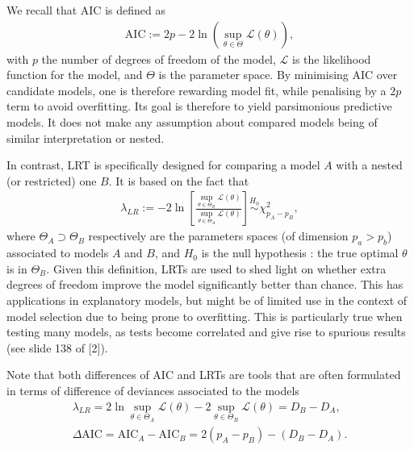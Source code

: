 \documentclass[a4paper, 12pt,oneside]{article}
\begin{document}
				We recall that AIC is defined as 
				\begin{gather}
					\text{AIC}:=2p-2\ln\left(\sup_{\theta\in\Theta}\mathcal{L(\theta)}\right),
				\end{gather}
				with $p$ the number of degrees of freedom of the model, $\mathcal L$ is the likelihood function for the model, and $\Theta$ is the parameter space. By minimising AIC over candidate models, one is therefore rewarding model fit, while penalising by a $2p$ term to avoid overfitting. Its goal is therefore to yield parsimonious predictive models. It does not make any assumption about compared models being of similar interpretation or nested. 

				In contrast, LRT is specifically designed for comparing a model $A$ with a nested (or restricted) one $B$. It is based on the fact that 
				\begin{gather}
					\lambda_{LR}:=-2\ln\left[\frac{\sup_{\theta\in\Theta_B}\mathcal{L(\theta)}}{\sup_{\theta\in\Theta_A}\mathcal{L(\theta)}}\right]
					\overset{H_0}{\sim} \chi^2_{p_A-p_B},
				\end{gather}
				where $\Theta_A\supset\Theta_B$ respectively are the parameters spaces (of dimension $p_a>p_b$) associated to models $A$ and $B$, and $H_0$ is the null hypothesis : the true optimal $\theta$ is in $\Theta_B$. Given this definition, LRTs are used to shed light on whether extra degrees of freedom improve the model significantly better than chance. This has applications in explanatory models, but might be of limited use in the context of model selection due to being prone to overfitting. This is particularly true when testing many models, as tests become correlated and give rise to spurious results (see slide 138 of [2]).

				Note that both differences of AIC and LRTs are tools that are often formulated in terms of difference of deviances associated to the models
				\begin{gather}
					\lambda_{LR} = 2\ln \sup_{\theta\in\Theta_A}\mathcal{L(\theta)} - 2 \sup_{\theta\in\Theta_B}\mathcal{L(\theta)} = D_B-D_A,\\
					\Delta \text{AIC} = \text{AIC}_A - \text{AIC}_B = 2(p_A-p_B) - (D_B-D_A). 
				\end{gather}
\end{document}
